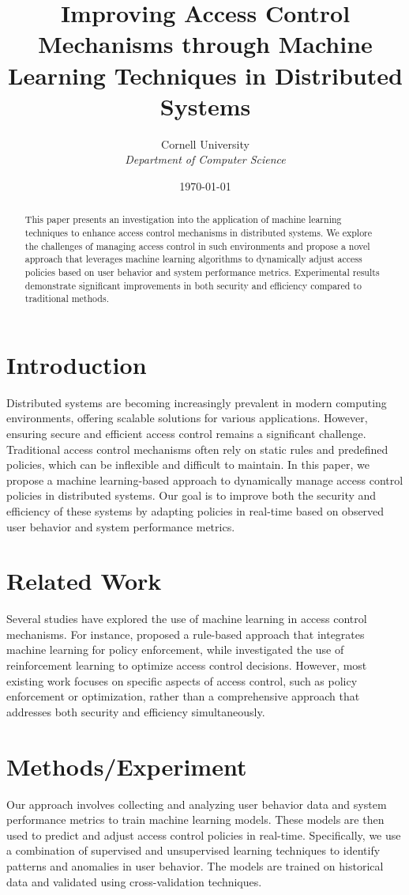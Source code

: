 \documentclass[12pt]{article}
\title{Improving Access Control Mechanisms through Machine Learning Techniques in Distributed Systems}
\author{
    \large Cornell University \\
    \normalsize \textit{Department of Computer Science} \\
}
\date{\today}
\begin{document}
\maketitle

\begin{abstract}
    This paper presents an investigation into the application of machine learning techniques to enhance access control mechanisms in distributed systems. We explore the challenges of managing access control in such environments and propose a novel approach that leverages machine learning algorithms to dynamically adjust access policies based on user behavior and system performance metrics. Experimental results demonstrate significant improvements in both security and efficiency compared to traditional methods.
\end{abstract}

\section{Introduction}
Distributed systems are becoming increasingly prevalent in modern computing environments, offering scalable solutions for various applications. However, ensuring secure and efficient access control remains a significant challenge. Traditional access control mechanisms often rely on static rules and predefined policies, which can be inflexible and difficult to maintain. In this paper, we propose a machine learning-based approach to dynamically manage access control policies in distributed systems. Our goal is to improve both the security and efficiency of these systems by adapting policies in real-time based on observed user behavior and system performance metrics.

\section{Related Work}
Several studies have explored the use of machine learning in access control mechanisms. For instance, \cite{ref1} proposed a rule-based approach that integrates machine learning for policy enforcement, while \cite{ref2} investigated the use of reinforcement learning to optimize access control decisions. However, most existing work focuses on specific aspects of access control, such as policy enforcement or optimization, rather than a comprehensive approach that addresses both security and efficiency simultaneously.

\section{Methods/Experiment}
Our approach involves collecting and analyzing user behavior data and system performance metrics to train machine learning models. These models are then used to predict and adjust access control policies in real-time. Specifically, we use a combination of supervised and unsupervised learning techniques to identify patterns and anomalies in user behavior. The models are trained on historical data and validated using cross-validation techniques. 
\end{document}

